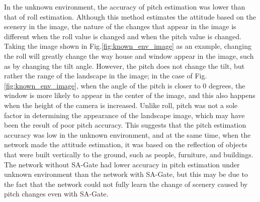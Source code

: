 In the unknown environment, the accuracy of pitch estimation was lower than that of roll estimation. Although this method estimates the attitude based on the scenery in the image, the nature of the changes that appear in the image is different when the roll value is changed and when the pitch value is changed. 
Taking the image shown in Fig.\ref{fig:known_env_image} as an example, changing the roll will greatly change the way house and window appear in the image, such as by changing the tilt angle. However, the pitch does not change the tilt, but rather the range of the landscape in the image; in the case of Fig.\ref{fig:known_env_image}, when the angle of the pitch is closer to 0 degrees, the window is more likely to appear in the center of the image, and this also happens when the height of the camera is increased. Unlike roll, pitch was not a sole factor in determining the appearance of the landscape image, which may have been the result of poor pitch accuracy. This suggests that the pitch estimation accuracy was low in the unknown environment, and at the same time, when the network made the attitude estimation, it was based on the reflection of objects that were built vertically to the ground, such as people, furniture, and buildings. The network without SA-Gate had lower accuracy in pitch estimation under unknown environment than the network with SA-Gate, but this may be due to the fact that the network could not fully learn the change of scenery caused by pitch changes even with SA-Gate.

